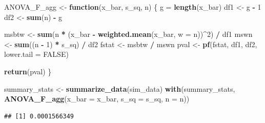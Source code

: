\documentclass[
]{book}
\newenvironment{Shaded}{\begin{snugshade}}{\end{snugshade}}
\newcommand{\AttributeTok}[1]{\textcolor[rgb]{0.13,0.29,0.53}{#1}}
\newcommand{\ConstantTok}[1]{\textcolor[rgb]{0.56,0.35,0.01}{#1}}
\newcommand{\ControlFlowTok}[1]{\textcolor[rgb]{0.13,0.29,0.53}{\textbf{#1}}}
\newcommand{\DecValTok}[1]{\textcolor[rgb]{0.00,0.00,0.81}{#1}}
\newcommand{\FunctionTok}[1]{\textcolor[rgb]{0.13,0.29,0.53}{\textbf{#1}}}
\newcommand{\NormalTok}[1]{#1}
\newcommand{\OtherTok}[1]{\textcolor[rgb]{0.56,0.35,0.01}{#1}}
\newcommand{\SpecialCharTok}[1]{\textcolor[rgb]{0.81,0.36,0.00}{\textbf{#1}}}
\begin{document}
\begin{Shaded}
\begin{Highlighting}[]
\NormalTok{ANOVA\_F\_agg }\OtherTok{\textless{}{-}} \ControlFlowTok{function}\NormalTok{(x\_bar, s\_sq, n) \{}
\NormalTok{  g }\OtherTok{=} \FunctionTok{length}\NormalTok{(x\_bar)}
\NormalTok{  df1 }\OtherTok{\textless{}{-}}\NormalTok{ g }\SpecialCharTok{{-}} \DecValTok{1}
\NormalTok{  df2 }\OtherTok{\textless{}{-}} \FunctionTok{sum}\NormalTok{(n) }\SpecialCharTok{{-}}\NormalTok{ g}
  
\NormalTok{  msbtw }\OtherTok{\textless{}{-}} \FunctionTok{sum}\NormalTok{(n }\SpecialCharTok{*}\NormalTok{ (x\_bar }\SpecialCharTok{{-}} \FunctionTok{weighted.mean}\NormalTok{(x\_bar, }\AttributeTok{w =}\NormalTok{ n))}\SpecialCharTok{\^{}}\DecValTok{2}\NormalTok{) }\SpecialCharTok{/}\NormalTok{ df1}
\NormalTok{  mswn }\OtherTok{\textless{}{-}} \FunctionTok{sum}\NormalTok{((n }\SpecialCharTok{{-}} \DecValTok{1}\NormalTok{) }\SpecialCharTok{*}\NormalTok{ s\_sq) }\SpecialCharTok{/}\NormalTok{ df2}
\NormalTok{  fstat }\OtherTok{\textless{}{-}}\NormalTok{ msbtw }\SpecialCharTok{/}\NormalTok{ mswn}
\NormalTok{  pval }\OtherTok{\textless{}{-}} \FunctionTok{pf}\NormalTok{(fstat, df1, df2, }\AttributeTok{lower.tail =} \ConstantTok{FALSE}\NormalTok{)}
 
  \FunctionTok{return}\NormalTok{(pval)}
\NormalTok{\}}

\NormalTok{summary\_stats }\OtherTok{\textless{}{-}} \FunctionTok{summarize\_data}\NormalTok{(sim\_data)}
\FunctionTok{with}\NormalTok{(summary\_stats, }\FunctionTok{ANOVA\_F\_agg}\NormalTok{(}\AttributeTok{x\_bar =}\NormalTok{ x\_bar, }\AttributeTok{s\_sq =}\NormalTok{ s\_sq, }\AttributeTok{n =}\NormalTok{ n))}
\end{Highlighting}
\end{Shaded}

\begin{verbatim}
## [1] 0.0001566349
\end{verbatim}
\end{document}
